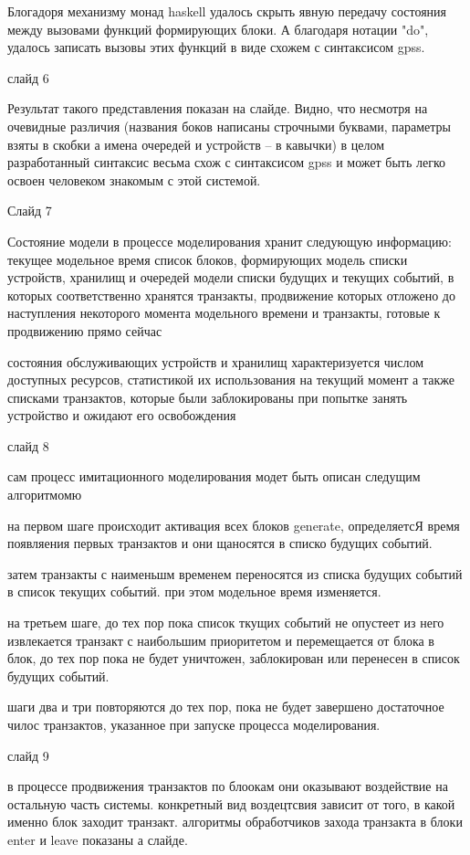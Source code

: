 \documentclass[utf8x, 12pt]{G7-32} %
\begin{document}
Блогадоря механизму монад haskell удалось скрыть явную передачу состояния между вызовами функций формирующих блоки. А благодаря нотации "do", удалось записать вызовы этих функций в виде схожем с синтаксисом gpss.

слайд 6

Результат такого представления показан на слайде. Видно, что несмотря на очевидные различия (названия боков написаны строчными буквами, параметры взяты в скобки а имена очередей и устройств -- в кавычки) в целом разработанный синтаксис весьма схож с синтаксисом gpss и может быть легко освоен человеком знакомым с этой системой.


Слайд 7

Состояние модели в процессе моделирования хранит следующую информацию:
текущее модельное время
список блоков, формирующих модель
списки устройств, хранилищ и очередей модели
списки будущих и текущих событий, в которых соответственно хранятся транзакты, продвижение которых отложено до наступления некоторого момента модельного времени и транзакты, готовые к продвижению прямо сейчас

состояния обслуживающих устройств и хранилищ характеризуется числом доступных ресурсов, статистикой их использования на текущий момент а также списками транзактов, которые были заблокированы при попытке занять устройство и ожидают его освобождения


слайд 8

сам процесс имитационного моделирования модет быть описан следущим алгоритмомю

на первом шаге происходит активация всех блоков generate, определяетсЯ время появляения первых транзактов и они щаносятся в списко будущих событий.

затем транзакты с наименьшм временем переносятся из списка будущих событий в список текущих событий. при этом модельное время изменяется.

на третьем шаге, до тех пор пока список ткущих событий не опустеет из него извлекается транзакт с наибольшим приоритетом и перемещается от блока в блок, до тех пор пока не будет уничтожен, заблокирован или перенесен в список будущих событий.

шаги два и три повторяются до тех пор, пока не будет завершено достаточное чилос транзактов, указанное при запуске процесса моделирования.

слайд 9

в процессе продвижения транзактов по блоокам они оказывают воздействие на остальную часть системы. конкретный вид воздецтсвия зависит от того, в какой именно блок заходит транзакт. алгоритмы обработчиков захода транзакта в блоки enter и leave показаны а слайде.
\end{document}
